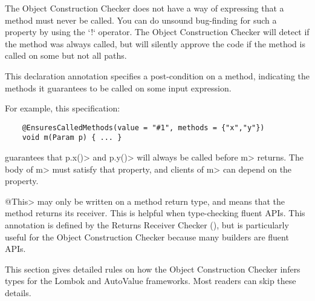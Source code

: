 \begin{description}
  The Object Construction Checker does not have a way of expressing that a
  method must never be called.  You can do unsound bug-finding for such a
  property by using the `!` operator.  The Object Construction Checker will
  detect if the method was always called, but will silently approve the code
  if the method is called on some but not all paths.

\item[\refqualclass{checker/objectconstruction/qual}{EnsuresCalledMethods}]
  This declaration annotation specifies a post-condition on a method, indicating the methods it
  guarantees to be called on some input expression.

  For example, this specification:

  \begin{Verbatim}
    @EnsuresCalledMethods(value = "#1", methods = {"x","y"})
    void m(Param p) { ... }
  \end{Verbatim}

  guarantees that \<p.x()> and \<p.y()> will always be called before \<m> returns.
  The body of \<m> must satisfy that property, and clients of \<m> can depend on the property.

\item[\refqualclass{common/returnsreceiver/qual}{This}]
  \<@This> may only be written on a method return type, and means that the method returns its receiver.
  This is helpful when type-checking fluent APIs. This annotation is defined by the
  Returns Receiver Checker (), but is particularly useful
  for the Object Construction Checker because many builders are fluent APIs.

\end{description}


This section gives detailed rules on how the Object Construction Checker infers types for the Lombok
and AutoValue frameworks. Most readers can skip these details.


